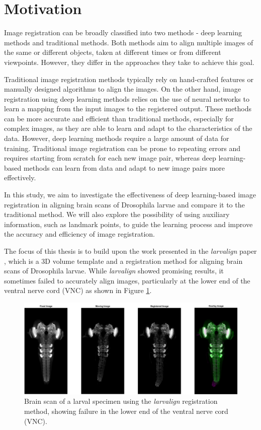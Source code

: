 \documentclass{book}
\begin{document}
	\section{Motivation} \label{sec:motivation}
	Image registration can be broadly classified into two methods - deep learning methods and traditional methods. Both methods aim to align multiple images of the same or different objects, taken at different times or from different viewpoints. However, they differ in the approaches they take to achieve this goal.
	
	Traditional image registration methods typically rely on hand-crafted features or manually designed algorithms to align the images. On the other hand, image registration using deep learning methods relies on the use of neural networks to learn a mapping from the input images to the registered output. These methods can be more accurate and efficient than traditional methods, especially for complex images, as they are able to learn and adapt to the characteristics of the data. However, deep learning methods require a large amount of data for training. Traditional image registration can be prone to repeating errors and requires starting from scratch for each new image pair, whereas deep learning-based methods can learn from data and adapt to new image pairs more effectively.
	
	In this study, we aim to investigate the effectiveness of deep learning-based image registration in aligning brain scans of Drosophila larvae and compare it to the traditional method. We will also explore the possibility of using auxiliary information, such as landmark points, to guide the learning process and improve the accuracy and efficiency of image registration.
	
	The focus of this thesis is to build upon the work presented in the \textit{larvalign} paper \cite{larvalign}, which is a 3D volume template and a registration method for aligning brain scans of Drosophila larvae. While \textit{larvalign} showed promising results, it sometimes failed to accurately align images, particularly at the lower end of the ventral nerve cord (VNC) as shown in Figure \ref{fig:Registraion_Failure}.
	
	\begin{figure}[h!]
		\centering
		\includegraphics[width=\linewidth]{resources/motivation_fig_1.jpg}
		\caption{Brain scan of a larval specimen using the \textit{larvalign} registration method, showing failure in the lower end of the ventral nerve cord (VNC).}
		\label{fig:Registraion_Failure}
	\end{figure}
	
\end{document}
